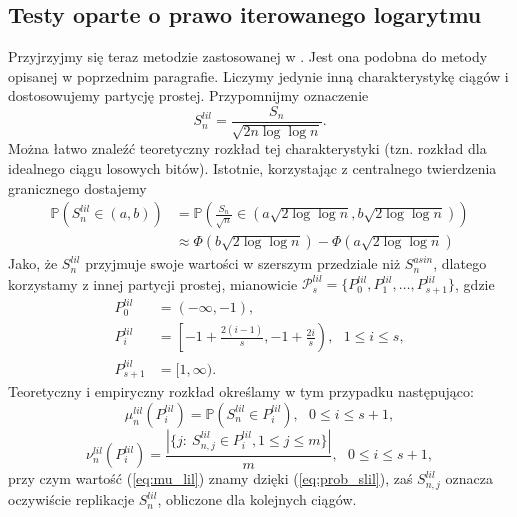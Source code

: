 \documentclass[a4paper,11pt,twoside]{book}
\newcommand{\Pro}[1]{\mathbb{P}\left(#1\right)}
\newcommand{\Slil}[1]{S^{lil}_#1}
\newcommand{\Sasin}[1]{S^{asin}_#1}
\theoremstyle{definition}
\begin{document}
\subsection{Testy oparte o prawo iterowanego logarytmu}
Przyjrzyjmy się teraz metodzie zastosowanej w \cite{wang-nic}. Jest ona podobna do metody opisanej w poprzednim paragrafie. Liczymy jedynie inną charakterystykę ciągów i dostosowujemy partycję prostej. Przypomnijmy oznaczenie
\begin{equation}
\Slil{n} = \frac{S_n}{\sqrt{2n \log \log n}}.
\end{equation}
Można łatwo znaleźć teoretyczny rozkład tej charakterystyki (tzn. rozkład dla idealnego ciągu losowych bitów). Istotnie, korzystając z centralnego twierdzenia granicznego dostajemy
\begin{equation}
\begin{split}
  \label{eq:prob_slil}
 \Pro{\Slil{n} \in (a,b)} &= \Pro{\frac{S_n}{\sqrt{n}} \in \left(a\sqrt{2 \log \log n},  b\sqrt{2 \log \log n}\right)}\\
 &\approx \Phi(b\sqrt{2 \log \log n}) - \Phi(a\sqrt{2 \log \log n})
\end{split}
\end{equation}
Jako, że $\Slil{n}$ przyjmuje swoje wartości w szerszym przedziale niż $\Sasin{n}$, dlatego korzystamy z innej partycji prostej, mianowicie $\mathcal{P}^{lil}_s = \{ P^{lil}_0, P^{lil}_1, \ldots, P^{lil}_{s+1}\}$, gdzie
\begin{equation*}
\begin{split}
  P^{lil}_0 &= (-\infty, -1),\\
  P^{lil}_i &= \left[-1 + \frac{2(i-1)}{s}, -1 + \frac{2i}{s} \right),\ \ \ 1 \leq i \leq s,\\
  P^{lil}_{s+1} &= [1, \infty).
\end{split}
\end{equation*}
Teoretyczny i empiryczny rozkład określamy w tym przypadku następująco:
\begin{equation}
 \label{eq:mu_lil}
 \mu^{lil}_n \left( P^{lil}_i \right) = \Pro{\Slil{n} \in P^{lil}_i},\ \ \ 0 \leq i \leq s+1,
\end{equation}
\begin{equation}
 \nu^{lil}_n \left( P^{lil}_i \right) = \frac{|\{ j:\ \Slil{{n,j}} \in  P^{lil}_i, 1 \leq j \leq m\}|}{m},\ \ \ 0 \leq i \leq s+1,
\end{equation}
przy czym wartość (\ref{eq:mu_lil}) znamy dzięki (\ref{eq:prob_slil}), zaś $\Slil{{n,j}}$ oznacza oczywiście replikacje $\Slil{n}$, obliczone dla kolejnych ciągów.
\end{document}
